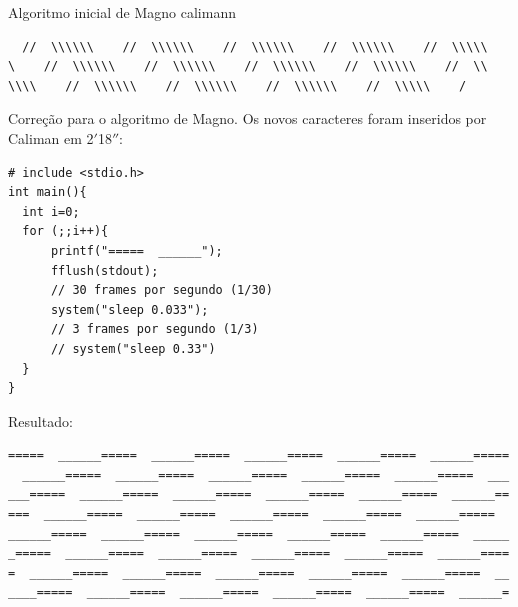 \begin{example}{Algoritmo inicial de Magno calimann}
\begin{verbatim}
  //  \\\\\\    //  \\\\\\    //  \\\\\\    //  \\\\\\    //  \\\\\
\    //  \\\\\\    //  \\\\\\    //  \\\\\\    //  \\\\\\    //  \\
\\\\    //  \\\\\\    //  \\\\\\    //  \\\\\\    //  \\\\\    /
\end{verbatim}

Correção para o algoritmo de Magno. Os novos caracteres foram inseridos por Caliman em 2$'$18$''$:

\begin{verbatim}
# include <stdio.h>
int main(){
  int i=0;
  for (;;i++){
      printf("=====  ______");
      fflush(stdout);
      // 30 frames por segundo (1/30)
      system("sleep 0.033");
      // 3 frames por segundo (1/3)
      // system("sleep 0.33")
  }
}
\end{verbatim}

Resultado:

\begin{verbatim}
=====  ______=====  ______=====  ______=====  ______=====  ______=====
  ______=====  ______=====  ______=====  ______=====  ______=====  ___
___=====  ______=====  ______=====  ______=====  ______=====  ______==
===  ______=====  ______=====  ______=====  ______=====  ______=====  
______=====  ______=====  ______=====  ______=====  ______=====  _____
_=====  ______=====  ______=====  ______=====  ______=====  ______====
=  ______=====  ______=====  ______=====  ______=====  ______=====  __
____=====  ______=====  ______=====  ______=====  ______=====  ______=


\end{verbatim}
\end{example}
